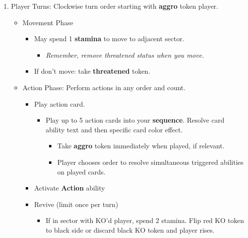 \documentclass[12pt]{article}
\newenvironment{enumerateCustom}
{\begin{enumerate}
  \setlength{\itemsep}{1pt}
  \setlength{\parskip}{0pt}
  \setlength{\parsep}{0pt}}
{\end{enumerate}}
\newenvironment{itemizeCustom}
{\begin{itemize}
  \setlength{\itemsep}{1pt}
  \setlength{\parskip}{0pt}
  \setlength{\parsep}{0pt}}
{\end{itemize}}
\begin{document}
\begin{mdframed}[style=SummaryCard, align=center, userdefinedwidth=40em, frametitle={Round Order Guide}]
\begin{enumerateCustom}
        \item Player Turns: Clockwise turn order starting with \textbf{aggro} token player.
            \begin{itemizeCustom}
                \item Movement Phase
                    \begin{itemizeCustom}
                        \item May spend 1 \textbf{stamina} to move to adjacent sector.
                            \begin{itemizeCustom}
                                \item \textit{Remember, remove threatened status when you move.}
                            \end{itemizeCustom}
                        \item If don't move: take \textbf{threatened} token.
                    \end{itemizeCustom}
                \item Action Phase: Perform actions in any order and count.
                    \begin{itemizeCustom}
                        \item Play action card.
                            \begin{itemizeCustom}
                                \item Play up to 5 action cards into your \textbf {sequence}. Resolve card ability text and then specific card color effect.
                                    \begin{itemizeCustom}
                                        \item Take \textbf{aggro} token immediately when played, if relevant.
                                        \item Player chooses order to resolve simultaneous triggered abilities on played cards.
                                    \end{itemizeCustom}
                            \end{itemizeCustom}
                        \item Activate \textbf{Action} ability
                        \item Revive (limit once per turn)
                            \begin{itemizeCustom}
                                \item If in sector with KO'd player, spend 2 stamina. Flip red KO token to black side or discard black KO token and player rises.
                            \end{itemizeCustom}


\end{itemizeCustom}
\end{itemizeCustom}
\end{enumerateCustom}
\end{mdframed}
\end{document}
